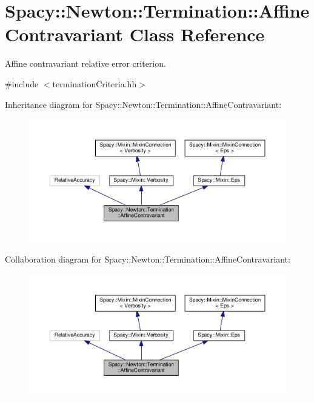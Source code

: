 \hypertarget{classSpacy_1_1Newton_1_1Termination_1_1AffineContravariant}{}\section{Spacy\+:\+:Newton\+:\+:Termination\+:\+:Affine\+Contravariant Class Reference}
\label{classSpacy_1_1Newton_1_1Termination_1_1AffineContravariant}


Affine contravariant relative error criterion.  




{\ttfamily \#include $<$termination\+Criteria.\+hh$>$}



Inheritance diagram for Spacy\+:\+:Newton\+:\+:Termination\+:\+:Affine\+Contravariant\+:
\nopagebreak
\begin{figure}[H]
\begin{center}
\leavevmode
\includegraphics[width=350pt]{classSpacy_1_1Newton_1_1Termination_1_1AffineContravariant__inherit__graph}
\end{center}
\end{figure}


Collaboration diagram for Spacy\+:\+:Newton\+:\+:Termination\+:\+:Affine\+Contravariant\+:
\nopagebreak
\begin{figure}[H]
\begin{center}
\leavevmode
\includegraphics[width=350pt]{classSpacy_1_1Newton_1_1Termination_1_1AffineContravariant__coll__graph}
\end{center}
\end{figure}
